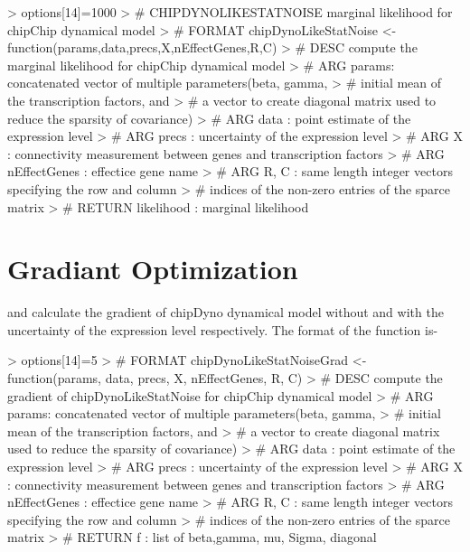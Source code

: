 \documentclass{article}
\begin{document}
\begin{Schunk}
\begin{Sinput}
> options[14]=1000
> # CHIPDYNOLIKESTATNOISE marginal likelihood for chipChip dynamical model
> # FORMAT chipDynoLikeStatNoise <- function(params,data,precs,X,nEffectGenes,R,C)
> # DESC compute the marginal likelihood for chipChip dynamical model
> # ARG params: concatenated vector of multiple parameters(beta, gamma, 
> # initial mean of the transcription factors, and 
> # a vector to create diagonal matrix used to reduce the sparsity of covariance)
> # ARG data : point estimate of the expression level
> # ARG precs : uncertainty of the expression level
> # ARG X : connectivity measurement between genes and transcription factors
> # ARG nEffectGenes : effectice gene name
> # ARG R, C : same length integer vectors specifying the row and column 
> # indices of the non-zero entries of the sparce matrix
> # RETURN likelihood : marginal likelihood
\end{Sinput}
\end{Schunk}


\section{Gradiant Optimization}

 and  calculate the gradient of  chipDyno dynamical model without and with the uncertainty of the expression level respectively.
The format of the function is-

\begin{Schunk}
\begin{Sinput}
> options[14]=5
> # FORMAT chipDynoLikeStatNoiseGrad <- function(params, data, precs, X, nEffectGenes, R, C)
> # DESC compute the gradient of chipDynoLikeStatNoise for chipChip dynamical model
> # ARG params: concatenated vector of multiple parameters(beta, gamma, 
> # initial mean of the transcription factors, and 
> # a vector to create diagonal matrix used to reduce the sparsity of covariance)
> # ARG data : point estimate of the expression level
> # ARG precs : uncertainty of the expression level
> # ARG X : connectivity measurement between genes and transcription factors
> # ARG nEffectGenes : effectice gene name
> # ARG R, C : same length integer vectors specifying the row and column 
> # indices of the non-zero entries of the sparce matrix
> # RETURN f : list of beta,gamma, mu, Sigma, diagonal
\end{Sinput}
\end{Schunk}
\end{document}
